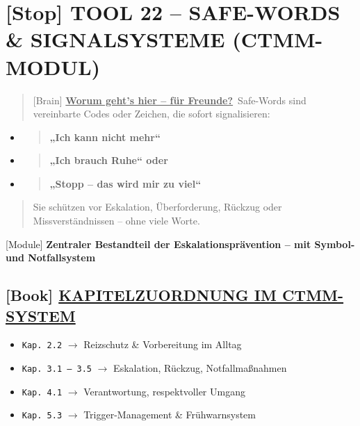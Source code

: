 \hypertarget{tool-22-safe-words-signalsysteme-ctmm-modul}{%
\section{\texorpdfstring{\textbf{[Stop] TOOL 22 -- SAFE-WORDS \& SIGNALSYSTEME (CTMM-MODUL)}}{[Stop] TOOL 22 -- SAFE-WORDS \& SIGNALSYSTEME (CTMM-MODUL)}}\label{tool-22-safe-words-signalsysteme-ctmm-modul}}

\begin{quote}
[Brain] \textbf{\ul{Worum geht's hier -- für Freunde?}}\
Safe-Words sind vereinbarte Codes oder Zeichen, die sofort signalisieren:
\end{quote}

\begin{itemize}
\item
  \begin{quote}
  \textbf{„Ich kann nicht mehr``}
  \end{quote}
\item
  \begin{quote}
  \textbf{„Ich brauch Ruhe`` oder}
  \end{quote}
\item
  \begin{quote}
  \textbf{„Stopp -- das wird mir zu viel``}
  \end{quote}
\end{itemize}

\begin{quote}
Sie schützen vor Eskalation, Überforderung, Rückzug oder Missverständnissen -- ohne viele Worte.
\end{quote}

[Module] \textbf{Zentraler Bestandteil der Eskalationsprävention -- mit Symbol- und Notfallsystem}

\hypertarget{kapitelzuordnung-im-ctmm-system}{%
\subsection{\texorpdfstring{[Book] \textbf{\ul{KAPITELZUORDNUNG IM CTMM-SYSTEM}}}{[Book] KAPITELZUORDNUNG IM CTMM-SYSTEM}}\label{kapitelzuordnung-im-ctmm-system}}

\begin{itemize}
\tightlist
\item
  \texttt{Kap.\ }\texttt{2.2} $\rightarrow$ Reizschutz \& Vorbereitung im Alltag
\item
  \texttt{Kap.\ }\texttt{3.1\ --\ 3.5} $\rightarrow$ Eskalation, Rückzug, Notfallmaßnahmen
\item
  \texttt{Kap.\ }\texttt{4.1} $\rightarrow$ Verantwortung, respektvoller Umgang
\item
  \texttt{Kap.\ }\texttt{5.3} $\rightarrow$ Trigger-Management \& Frühwarnsystem
\end{itemize}

